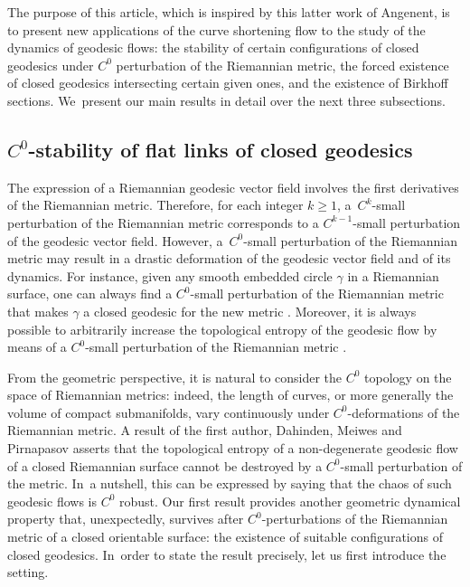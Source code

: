 \documentclass[JEP,XML,SOM,Unicode,NoFloatCountersInSection,published]{cedram}
\theoremstyle{plain}
\theoremstyle{definition}
\begin{document}
The purpose of this article, which is inspired by this latter work of Angenent, is to present new applications of the curve shortening flow to the study of the dynamics of geodesic flows: the stability of certain configurations of closed geodesics under $C^0$ perturbation of the Riemannian metric, the forced existence of closed geodesics intersecting certain given ones, and the existence of Birkhoff sections. We~present our main results in detail over the next three subsections.

\subsection{$C^0$-stability of flat links of closed geodesics}\label{ss:C0_stability}

The expression of a Riemannian geodesic vector field involves the first derivatives of the Riemannian metric. Therefore, for each integer $k\geq1$, a~$C^k$-small perturbation of the Riemannian metric corresponds to a $C^{k-1}$-small perturbation of the geodesic vector field. However, a~$C^0$\nobreakdash-small perturbation of the Riemannian metric may result in a drastic deformation of the geodesic vector field and of its dynamics. For instance, given any smooth embedded circle $\gamma$ in a Riemannian surface, one can always find a $C^0$-small perturbation of the Riemannian metric that makes $\gamma$ a closed geodesic for the new metric \cite[Ex.\,43]{Alves:2022aa}. Moreover, it is always possible to arbitrarily increase the topological entropy of the geodesic flow by means of a $C^0$-small perturbation of the Riemannian metric \cite[Th.\,12]{Alves:2022aa}.

From the geometric perspective, it is natural to consider the $C^0$ topology on the space of Riemannian metrics: indeed, the length of curves, or more generally the volume of compact submanifolds, vary continuously under $C^0$-deformations of the Riemannian metric.
A result of the first author, Dahinden, Meiwes and Pirnapasov \cite{Alves:2023aa} asserts that the topological entropy of a non-degenerate geodesic flow of a closed Riemannian surface cannot be destroyed by a $C^0$-small perturbation of the metric. In~a nutshell, this can be expressed by saying that the chaos of such geodesic flows is $C^0$ robust.
Our first result provides another geometric dynamical property that, unexpectedly, survives after $C^0$-perturbations of the Riemannian metric of a closed orientable surface: the existence of suitable configurations of closed geodesics. In~order to state the result precisely, let us first introduce the setting.
\end{document}
